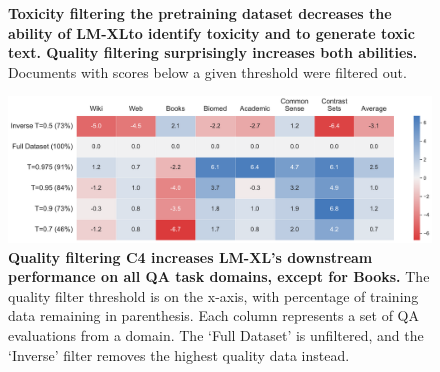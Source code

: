 \documentclass{article}
\newcommand{\bigLM}[0]{\textsc{LM-XL}}
\begin{document}
\begin{figure}[t]
    \centering
    
    \caption{
    \textbf{Toxicity filtering the pretraining dataset decreases the ability of \bigLM to identify toxicity and to generate toxic text. Quality filtering surprisingly increases both abilities.} Documents with scores below a given threshold were filtered out.
    }
    \label{fig:tox_qual_filter_c4}
    \vspace{-3mm}
\end{figure}

\begin{figure}[t]
    \centering
    \includegraphics[width=.98\textwidth]{fables/toxicity/qualonly_on_domains_cc.pdf}
    \caption{
    \textbf{Quality filtering C4 increases \bigLM's downstream performance on all QA task domains, except for Books.} 
    The quality filter threshold is on the x-axis, with percentage of training data remaining in parenthesis. 
    Each column represents a set of QA evaluations from a domain.
    The `Full Dataset' is unfiltered, and the `Inverse' filter removes the highest quality data instead.
    }
    \label{fig:qual_filter_on_domains}
\end{figure}
\end{document}
